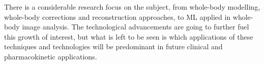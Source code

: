 There is a considerable research focus on the subject, from whole-body modelling, whole-body corrections and reconstruction approaches, to ML applied in whole-body image analysis. The technological advancements are going to further fuel this growth of interest, but what is left to be seen is which applications of these techniques and technologies will be predominant in future clinical and pharmacokinetic applications.